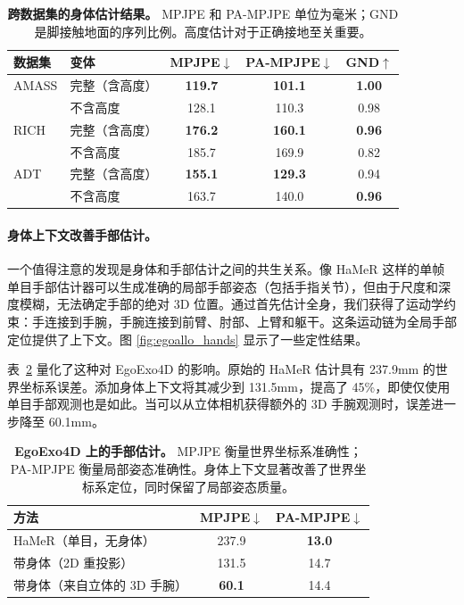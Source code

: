 \documentclass[../../book-main_zh.tex]{subfiles}
\begin{document}
\begin{table}[t]
    \centering
    \caption{\textbf{跨数据集的身体估计结果。} MPJPE
        和 PA-MPJPE 单位为毫米；GND 是脚接触地面的序列比例。高度估计对于正确接地至关重要。}
    \label{tab:egoallo_body_results}
    \small
    \begin{tabular}{llccc}
        \toprule
        \textbf{数据集} & \textbf{变体} &
        \textbf{MPJPE}$\downarrow$ & \textbf{PA-MPJPE}$\downarrow$ &
        \textbf{GND}$\uparrow$ \\
        \midrule
        AMASS & 完整（含高度） & \textbf{119.7} & \textbf{101.1}
        & \textbf{1.00} \\
        & 不含高度 & 128.1 & 110.3 & 0.98 \\
        \midrule
        RICH  & 完整（含高度） & \textbf{176.2} & \textbf{160.1}
        & \textbf{0.96} \\
        & 不含高度 & 185.7 & 169.9 & 0.82 \\
        \midrule
        ADT   & 完整（含高度） & \textbf{155.1} & \textbf{129.3} & 0.94 \\
        & 不含高度 & 163.7 & 140.0 & \textbf{0.96} \\
        \bottomrule
    \end{tabular}
\end{table}

\paragraph{身体上下文改善手部估计。}
一个值得注意的发现是身体和手部估计之间的共生关系。像 HaMeR 这样的单帧单目手部估计器可以生成准确的局部手部姿态（包括手指关节），但由于尺度和深度模糊，无法确定手部的绝对 3D 位置。通过首先估计全身，我们获得了运动学约束：手连接到手腕，手腕连接到前臂、肘部、上臂和躯干。这条运动链为全局手部定位提供了上下文。图 \ref{fig:egoallo_hands} 显示了一些定性结果。

表~\ref{tab:egoallo_hands} 量化了这种对 EgoExo4D 的影响。原始的 HaMeR 估计具有 237.9mm 的世界坐标系误差。添加身体上下文将其减少到 131.5mm，提高了 45\%，即使仅使用单目手部观测也是如此。当可以从立体相机获得额外的 3D 手腕观测时，误差进一步降至 60.1mm。

\begin{table}[t]
    \centering
    \caption{\textbf{EgoExo4D 上的手部估计。} MPJPE 衡量世界坐标系准确性；PA-MPJPE 衡量局部姿态准确性。身体上下文显著改善了世界坐标系定位，同时保留了局部姿态质量。}
    \label{tab:egoallo_hands}
    \small
    \begin{tabular}{lcc}
        \toprule
        \textbf{方法} & \textbf{MPJPE}$\downarrow$ &
        \textbf{PA-MPJPE}$\downarrow$ \\
        \midrule
        HaMeR（单目，无身体） & 237.9 & \textbf{13.0} \\
        \midrule
        带身体（2D 重投影） & 131.5 & 14.7 \\
        带身体（来自立体的 3D 手腕） & \textbf{60.1} & 14.4 \\
        \bottomrule
    \end{tabular}
\end{table}
\end{document}
